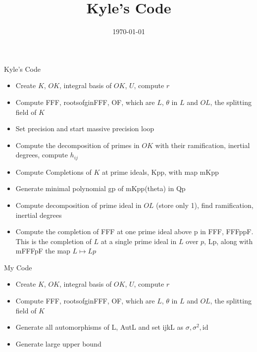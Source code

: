 \documentclass[11pt]{article}
\title{Kyle's Code}
\author{}
\date{\today}                                           %
\theoremstyle{definition}
\begin{document}
\maketitle


\begin{multicols}{2}
Kyle's Code
\begin{itemize}
\item Create $K$, $OK$, integral basis of $OK$, $U$, compute $r$
\item Compute FFF, rootsofginFFF, OF, which are $L$, $\theta$ in $L$ and $OL$, the splitting field of $K$
\item Set precision and start massive precision loop
\item Compute the decomposition of primes in $OK$ with their ramification, inertial degrees, compute $h_{ij}$
\item Compute Completions of $K$ at prime ideals, Kpp, with map mKpp
\item Generate minimal polynomial gp of mKpp(theta) in Qp
\item Compute decomposition of prime ideal in $OL$ (store only 1), find ramification, inertial degrees
\item Compute the completion of FFF at one prime ideal above p in FFF, FFFppF. This is the completion of $L$ at a single prime ideal in $L$ over $p$, Lp, along with mFFFpF the map $L \mapsto Lp$
\end{itemize}

\columnbreak

My Code
\begin{itemize}
\item Create $K$, $OK$, integral basis of $OK$, $U$, compute $r$
\item Compute FFF, rootsofginFFF, OF, which are $L$, $\theta$ in $L$ and $OL$, the splitting field of $K$ 
\item Generate all automorphisms of L, AutL and set ijkL as $\sigma, \sigma^2, \text{id}$
\item Generate large upper bound
\end{itemize}
\end{multicols}
\end{document}
